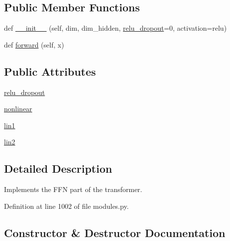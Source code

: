 \subsection*{Public Member Functions}
\begin{DoxyCompactItemize}
\item 
def \hyperlink{classparlai_1_1agents_1_1transformer_1_1modules_1_1TransformerFFN_a89cffa1831968953cdd7dfdfa7867944}{\+\_\+\+\_\+init\+\_\+\+\_\+} (self, dim, dim\+\_\+hidden, \hyperlink{classparlai_1_1agents_1_1transformer_1_1modules_1_1TransformerFFN_a22f7891e6b991a8ee6b58f08c12cf4ae}{relu\+\_\+dropout}=0, activation=\textquotesingle{}relu\textquotesingle{})
\item 
def \hyperlink{classparlai_1_1agents_1_1transformer_1_1modules_1_1TransformerFFN_a54f8d1ec7c0c4228f78a3be843ab3003}{forward} (self, x)
\end{DoxyCompactItemize}
\subsection*{Public Attributes}
\begin{DoxyCompactItemize}
\item 
\hyperlink{classparlai_1_1agents_1_1transformer_1_1modules_1_1TransformerFFN_a22f7891e6b991a8ee6b58f08c12cf4ae}{relu\+\_\+dropout}
\item 
\hyperlink{classparlai_1_1agents_1_1transformer_1_1modules_1_1TransformerFFN_a234566d2ffaffe67f04c4592cfc84265}{nonlinear}
\item 
\hyperlink{classparlai_1_1agents_1_1transformer_1_1modules_1_1TransformerFFN_addc959c81b7c0ba87a47415af7f07e16}{lin1}
\item 
\hyperlink{classparlai_1_1agents_1_1transformer_1_1modules_1_1TransformerFFN_ae0ee11939e782034e2d9809f18ed4708}{lin2}
\end{DoxyCompactItemize}


\subsection{Detailed Description}
\begin{DoxyVerb}Implements the FFN part of the transformer.\end{DoxyVerb}
 

Definition at line 1002 of file modules.\+py.



\subsection{Constructor \& Destructor Documentation}
\mbox{\label{classparlai_1_1agents_1_1transformer_1_1modules_1_1TransformerFFN_a89cffa1831968953cdd7dfdfa7867944}} 
